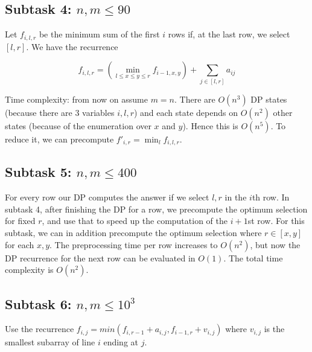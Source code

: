 \documentclass{article}
\begin{document}
\subsection*{Subtask 4: $n, m \le 90$}

Let $f_{i,l,r}$ be the minimum sum of the first $i$ rows if, at the last row, we select $[l, r]$. We have the recurrence

\[
    f_{i,l,r} = \left( \min_{l \le x \le y \le r} f_{i-1,x,y} \right) + \sum_{j \in [l, r]} a_{ij}
\]

Time complexity: from now on assume $m=n$. There are $O(n^3)$ DP states (because there are 3 variables $i,l,r$) and each state depends on $O(n^2)$ other states (because of the enumeration over $x$ and $y$). Hence this is $O(n^5)$. To reduce it, we can precompute $f'_{i,r} = \min_l f_{i,l,r}$.

\subsection*{Subtask 5: $n, m \le 400$}

For every row our DP computes the answer if we select $l, r$ in the $i$th row. In subtask 4, after finishing the DP for a row, we precompute the optimum selection for fixed $r$, and use that to speed up the computation of the $i+1$st row. For this subtask, we can in addition precompute the optimum selection where $r \in [x, y]$ for each $x,y$. The preprocessing time per row increases to $O(n^2)$, but now the DP recurrence for the next row can be evaluated in $O(1)$. The total time complexity is $O(n^2)$.

\subsection*{Subtask 6: $n, m \le 10^3$}

Use the recurrence $f_{i,j} = min(f_{i, r-1} + a_{i,j}, f_{i-1,r} + v_{i,j})$ where $v_{i,j}$ is the smallest subarray of line $i$ ending at $j$.
\end{document}
